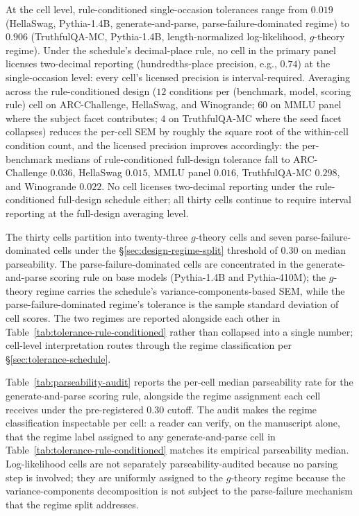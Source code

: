 \documentclass[11pt]{article}
\begin{document}
\begin{sloppypar}
At the cell level, rule-conditioned single-occasion tolerances range from $0.019$ (HellaSwag, Pythia-1.4B, generate-and-parse, parse-failure-dominated regime) to $0.906$ (TruthfulQA-MC, Pythia-1.4B, length-normalized log-likelihood, $g$-theory regime). Under the schedule's decimal-place rule, no cell in the primary panel licenses two-decimal reporting (hundredths-place precision, e.g., $0.74$) at the single-occasion level: every cell's licensed precision is interval-required. Averaging across the rule-conditioned design ($12$ conditions per (benchmark, model, scoring rule) cell on ARC-Challenge, HellaSwag, and Winogrande; $60$ on MMLU panel where the subject facet contributes; $4$ on TruthfulQA-MC where the seed facet collapses) reduces the per-cell SEM by roughly the square root of the within-cell condition count, and the licensed precision improves accordingly: the per-benchmark medians of rule-conditioned full-design tolerance fall to ARC-Challenge $0.036$, HellaSwag $0.015$, MMLU panel $0.016$, TruthfulQA-MC $0.298$, and Winogrande $0.022$. No cell licenses two-decimal reporting under the rule-conditioned full-design schedule either; all thirty cells continue to require interval reporting at the full-design averaging level.
\end{sloppypar}

The thirty cells partition into twenty-three $g$-theory cells and seven parse-failure-dominated cells under the §\ref{sec:design-regime-split} threshold of $0.30$ on median parseability. The parse-failure-dominated cells are concentrated in the generate-and-parse scoring rule on base models (Pythia-1.4B and Pythia-410M); the $g$-theory regime carries the schedule's variance-components-based SEM, while the parse-failure-dominated regime's tolerance is the sample standard deviation of cell scores. The two regimes are reported alongside each other in Table~\ref{tab:tolerance-rule-conditioned} rather than collapsed into a single number; cell-level interpretation routes through the regime classification per §\ref{sec:tolerance-schedule}.

Table~\ref{tab:parseability-audit} reports the per-cell median parseability rate for the generate-and-parse scoring rule, alongside the regime assignment each cell receives under the pre-registered $0.30$ cutoff. The audit makes the regime classification inspectable per cell: a reader can verify, on the manuscript alone, that the regime label assigned to any generate-and-parse cell in Table~\ref{tab:tolerance-rule-conditioned} matches its empirical parseability median. Log-likelihood cells are not separately parseability-audited because no parsing step is involved; they are uniformly assigned to the $g$-theory regime because the variance-components decomposition is not subject to the parse-failure mechanism that the regime split addresses.
\end{document}
